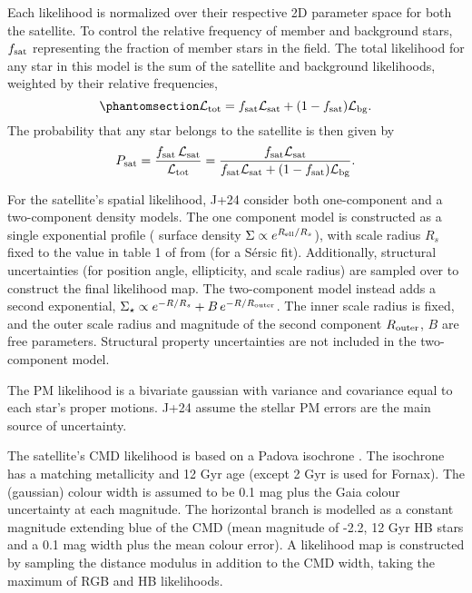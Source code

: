 Each likelihood is normalized over their respective 2D parameter space
for both the satellite. To control the relative frequency of member and
background stars, \(f_{\rm sat}\) representing the fraction of member
stars in the field. The total likelihood for any star in this model is
the sum of the satellite and background likelihoods, weighted by their
relative frequencies,
\begin{equation}\protect\phantomsection\label{eq:Ltot}{
{\cal L}_{\rm tot} = f_{\rm sat}{\cal L}_{\rm sat} + (1-f_{\rm sat}){\cal L}_{\rm bg}.
}\end{equation} The probability that any star belongs to the satellite
is then given by \begin{equation}{
P_{\rm sat} = 
\frac{f_{\rm sat}\,{\cal L}_{\rm sat}}{{\cal L}_{\rm tot}}
= \frac{f_{\rm sat}{\cal L}_{\rm sat}}{f_{\rm sat}{\cal L}_{\rm sat} + (1-f_{\rm sat}){\cal L}_{\rm bg}}.
}\end{equation}

For the satellite's spatial likelihood, J+24 consider both one-component
and a two-component density models. The one component model is
constructed as a single exponential profile ( surface density
\(\Sigma \propto e^{R_{\rm ell} / R_s}\)), with scale radius \(R_s\)
fixed to the value in table 1 of \citet{MV2020a} from \citet{munoz+2018}
(for a Sérsic fit). Additionally, structural uncertainties (for position
angle, ellipticity, and scale radius) are sampled over to construct the
final likelihood map. The two-component model instead adds a second
exponential,
\(\Sigma_\star \propto e^{-R/R_s} + B\,e^{-R/R_{\rm outer}}\). The inner
scale radius is fixed, and the outer scale radius and magnitude of the
second component \(R_{\rm outer}\), \(B\) are free parameters.
Structural property uncertainties are not included in the two-component
model.

The PM likelihood is a bivariate gaussian with variance and covariance
equal to each star's proper motions. J+24 assume the stellar PM errors
are the main source of uncertainty.

The satellite's CMD likelihood is based on a Padova isochrone
\citep{girardi+2002}. The isochrone has a matching metallicity and 12
Gyr age (except 2 Gyr is used for Fornax). The (gaussian) colour width
is assumed to be 0.1 mag plus the Gaia colour uncertainty at each
magnitude. The horizontal branch is modelled as a constant magnitude
extending blue of the CMD (mean magnitude of -2.2, 12 Gyr HB stars and a
0.1 mag width plus the mean colour error). A likelihood map is
constructed by sampling the distance modulus in addition to the CMD
width, taking the maximum of RGB and HB likelihoods.

